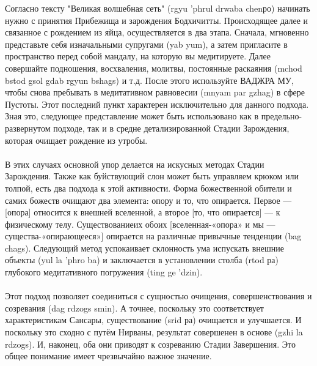 Согласно тексту "Великая волшебная сеть" (rgyu 'phrul drwaba chenро) начинать
нужно с принятия Прибежища и зарождения Бодхичитты. Происходящее далее и связанное
с рождением из яйца, осуществляется в два этапа. Сначала, мгновенно представьте себя
изначальными супругами (yab yum), а затем пригласите в пространство перед собой мандалу,
на которую вы медитируете. Далее совершайте подношения, восхваления, молитвы,
постоянные раскаяния (mchod bstod gsol gdab rgyun bshags) и т.д. После этого используйте
ВАДЖРА МУ, чтобы снова пребывать в медитативном равновесии (mnyam par gzhag) в
сфере Пустоты. Этот последний пункт характерен исключительно для данного подхода.
Зная это, следующее представление может быть использовано как в предельно-развернутом
подходе, так и в средне детализированной Стадии Зарождения, которая очищает рождение
из утробы.\\
\\
В этих случаях основной упор делается на искусных методах Стадии Зарождения.
Также как буйствующий слон может быть управляем крюком или толпой, есть два подхода к этой
активности. Форма божественной обители и самих божеств очищают два элемента: опору и
то, что опирается. Первое — [опора] относится к внешней вселенной, а второе
[то, что опирается] — к физическому телу. Существованиеих обоих
[вселенная-«опора» и мы — существа-«опирающееся»] опирается на различные
привычные тенденции (bag chags). Следующий метод успокаивает склонность ума
испускать внешние объекты (yul la 'phro ba) и заключается в установлении
столба (rtod ра) глубокого медитативного погружения (ting ge 'dzin).\\
\\
Этот подход позволяет соединиться с сущностью очищения, совершенствования и
созревания (dag rdzogs smin). А точнее, поскольку это соответствует характеристикам
Сансары, существование (srid ра) очищается и улучшается. И поскольку это сходно с путём
Нирваны, результат совершенен в основе (gzhi la rdzogs). И, наконец, оба они приводят к
созреванию Стадии Завершения. Это общее понимание имеет чрезвычайно важное значение.\\

